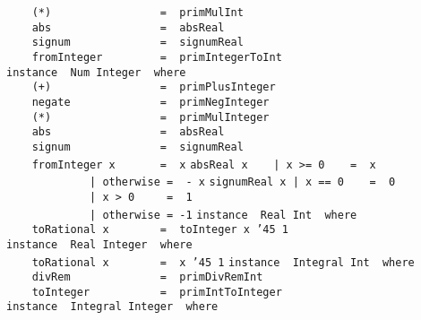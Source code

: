 \mbox{\tt \ \ \ \ (*)\ \ \ \ \ \ \ \ \ \ \ \ \ \ \ \ \ =\ \ primMulInt}\\
\mbox{\tt \ \ \ \ abs\ \ \ \ \ \ \ \ \ \ \ \ \ \ \ \ \ =\ \ absReal}\\
\mbox{\tt \ \ \ \ signum\ \ \ \ \ \ \ \ \ \ \ \ \ \ =\ \ signumReal}\\
\mbox{\tt \ \ \ \ fromInteger\ \ \ \ \ \ \ \ \ =\ \ primIntegerToInt}
%
\eprogB\noindent\bprogB
\mbox{\tt instance\ \ Num\ Integer\ \ where}\\
\mbox{\tt \ \ \ \ (+)\ \ \ \ \ \ \ \ \ \ \ \ \ \ \ \ \ =\ \ primPlusInteger}\\
\mbox{\tt \ \ \ \ negate\ \ \ \ \ \ \ \ \ \ \ \ \ \ =\ \ primNegInteger}\\
\mbox{\tt \ \ \ \ (*)\ \ \ \ \ \ \ \ \ \ \ \ \ \ \ \ \ =\ \ primMulInteger}\\
\mbox{\tt \ \ \ \ abs\ \ \ \ \ \ \ \ \ \ \ \ \ \ \ \ \ =\ \ absReal}\\
\mbox{\tt \ \ \ \ signum\ \ \ \ \ \ \ \ \ \ \ \ \ \ =\ \ signumReal}\\
\mbox{\tt \ \ \ \ fromInteger\ x\ \ \ \ \ \ \ =\ \ x}
%
\eprogB\noindent\bprogB
\mbox{\tt absReal\ x\ \ \ \ |\ x\ >=\ 0\ \ \ \ =\ \ x}\\
\mbox{\tt \ \ \ \ \ \ \ \ \ \ \ \ \ |\ otherwise\ =\ \ -\ x}
\eprogB\noindent\bprogB
\mbox{\tt signumReal\ x\ |\ x\ ==\ 0\ \ \ \ =\ \ 0}\\
\mbox{\tt \ \ \ \ \ \ \ \ \ \ \ \ \ |\ x\ >\ 0\ \ \ \ \ =\ \ 1}\\
\mbox{\tt \ \ \ \ \ \ \ \ \ \ \ \ \ |\ otherwise\ =\ -1}
\eprogB\noindent\bprogB
\mbox{\tt instance\ \ Real\ Int\ \ where}\\
\mbox{\tt \ \ \ \ toRational\ x\ \ \ \ \ \ \ \ =\ \ toInteger\ x\ {\char'45}\ 1}
%
\eprogB\noindent\bprogB
\mbox{\tt instance\ \ Real\ Integer\ \ where}\\
\mbox{\tt \ \ \ \ toRational\ x\ \ \ \ \ \ \ \ =\ \ x\ {\char'45}\ 1}
%
\eprogB\noindent\bprogB
\mbox{\tt instance\ \ Integral\ Int\ \ where}\\
\mbox{\tt \ \ \ \ divRem\ \ \ \ \ \ \ \ \ \ \ \ \ \ =\ \ primDivRemInt}\\
\mbox{\tt \ \ \ \ toInteger\ \ \ \ \ \ \ \ \ \ \ =\ \ primIntToInteger}
%
\eprogB\noindent\bprogB
\mbox{\tt instance\ \ Integral\ Integer\ \ where}\\

